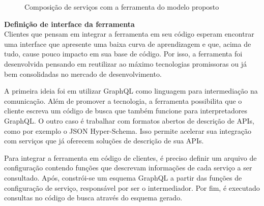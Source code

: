 \begin{figure}[H]
  \centering
  \caption{Composição de serviços com a ferramenta do modelo proposto}
\end{figure}

\textbf{Definição de interface da ferramenta} \\

Clientes que pensam em integrar a ferramenta em seu código esperam encontrar uma interface que apresente uma baixa curva de aprendizagem e que, acima de tudo, cause pouco impacto em sua base de código. Por isso, a ferramenta foi desenvolvida pensando em reutilizar ao máximo tecnologias promissoras ou já bem consolidadas no mercado de desenvolvimento.

A primeira ideia foi em utilizar GraphQL como linguagem para intermediação na comunicação. Além de promover a tecnologia, a ferramenta possibilita que o cliente escreva um código de busca que também funcione para interpretadores GraphQL. O outro caso é trabalhar com formatos abertos de descrição de APIs, como por exemplo o JSON Hyper-Schema. Isso permite acelerar sua integração com serviços que já oferecem soluções de descrição de sua APIs.

Para integrar a ferramenta em código de clientes, é preciso definir um arquivo de configuração contendo funções que descrevam informações de cada serviço a ser consultado. Após, constrói-se um esquema GraphQL a partir das funções de configuração de serviço, responsável por ser o intermediador. Por fim, é executado consultas no código de busca através do esquema gerado.

